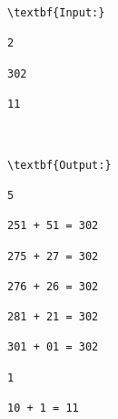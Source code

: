 \begin{verbatim}
\textbf{Input:}

2

302

11



\textbf{Output:}

5

251 + 51 = 302

275 + 27 = 302

276 + 26 = 302

281 + 21 = 302

301 + 01 = 302

1

10 + 1 = 11

\end{verbatim}